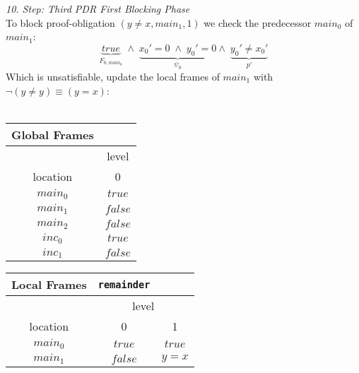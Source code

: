 \documentclass{article}
\begin{document}
	\textsl{10. Step: Third PDR First Blocking Phase} \\
		To block proof-obligation $(y \neq x, main_1, 1)$ we check the predecessor $main_0$ of $main_1$: \\
	\begin{equation*}
	\underbrace{true}_{F_{0, main_0}}\; \land \; \underbrace{x_0' = 0 \; \land \; y_0' = 0}_{\psi_0} \land \; \underbrace{y_0' \neq x_0'}_{p'}
	\end{equation*}
	Which is unsatisfiable, update the local frames of $main_1$ with $\neg(y \neq y) \equiv (y = x)$: \\ \\ 
	\begin{minipage}{.5\textwidth}
		\setlength\tabcolsep{0.35em}
		\begin{center}
			\begin{tabu}{cc}
				Global Frames \\
				\toprule
				& level \\
				\cmidrule(lr){2-2}
				location & 0 \\
				$main_0$ & $true$ \\
				$main_1$ & $false$ \\
				$main_2$ & $false$ \\
				$inc_0$ & $true$ \\
				$inc_1$ & $false$\\
				\bottomrule
			\end{tabu}
		\end{center}
	\end{minipage}
	\hfill
	\begin{minipage}{.4\textwidth}
		\setlength\tabcolsep{0.35em}
		\begin{center}
			\begin{tabu}{ccc}
				Local Frames & \texttt{remainder}\\
				\toprule
				& \multicolumn{2}{c}{level} \\
				\cmidrule(lr){2-3}
				location & 0 & 1\\
				\cmidrule{1-3}
				$main_0$ & $true$ & $true$ \\
				$main_1$ & $false$ & $y = x$\\
				\bottomrule
			\end{tabu}
		\end{center}	
	\end{minipage}
	
	\vspace*{2em}
	
\end{document}
